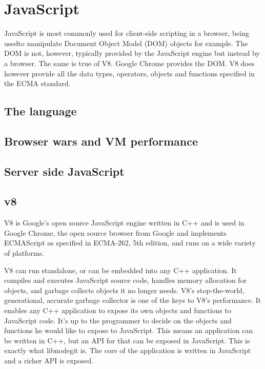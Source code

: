 \section{JavaScript}

JavaScript is most commonly used for client-side scripting in a browser, being
usedto manipulate Document Object Model (DOM) objects for example. The DOM is
not, however, typically provided by the JavaScript engine but instead by a
browser. The same is true of V8. Google Chrome provides the DOM. V8 does however
provide all the data types, operators, objects and functions specified in the
ECMA standard.

\subsection{The language}

\subsection{Browser wars and VM performance }

\subsection{Server side JavaScript}

\subsection{v8}

V8 is Google\’'s open source JavaScript engine written in C++ and is used in
Google Chrome, the open source browser from Google and implements ECMAScript as
specified in ECMA-262, 5th edition, and runs on a wide variety of platforms.

V8 can run standalone, or can be embedded into any C++ application. It compiles
and executes JavaScript source code, handles memory allocation for objects, and
garbage collects objects it no longer needs. V8’s stop-the-world, generational,
accurate garbage collector is one of the keys to V8’s performance. It enables
any C++ application to expose its own objects and functions to JavaScript code.
It’s up to the programmer to decide on the objects and functions he would like
to expose to JavaScript. This means an application can be written in C++, but an
API for that can be exposed in JavaScript. This is exactly what libnodegit is.
The core of the application is written in JavaScript and a richer API is
exposed.

